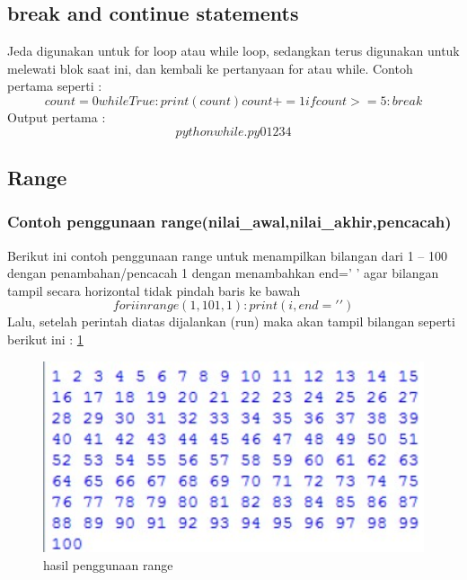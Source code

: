 \subsection{break and continue statements}
Jeda digunakan untuk for loop atau while loop, sedangkan terus digunakan untuk melewati blok saat ini, dan kembali ke pertanyaan for atau while.
Contoh pertama seperti :
\begin{equation}
count = 0
while True:
    print(count)
    count += 1
    if count >= 5:
        break
		\end{equation}
Output pertama :
\begin{equation}
python while.py
0
1
2
3
4
\end{equation}

\subsection{Range}
\subsubsection{Contoh penggunaan range(nilai_awal,nilai_akhir,pencacah)}
Berikut ini contoh penggunaan range untuk menampilkan bilangan dari 1 – 100 dengan penambahan/pencacah 1 dengan menambahkan end=’ ’ agar bilangan tampil secara horizontal tidak pindah baris ke bawah
\begin{equation}
for i in range(1, 101, 1) :
    print(i, end=' ')
\end{equation}
Lalu, setelah perintah diatas dijalankan (run) maka akan tampil bilangan seperti berikut ini :
\ref{2_range}

\begin{figure}[ht]
    \centerline{\includegraphics[width=1\textwidth]{figures/2_range.JPG}}
    \caption{hasil penggunaan range}
    \label{2_range}
    \end{figure}

